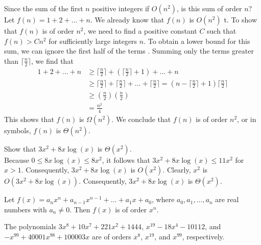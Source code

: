 \documentclass[12pt]{article}
\begin{document}
\begin{example} Since the sum of the first $n$ positive integers if $O(n^2)$, is this sum of order $n$? \\ 
Let $f(n) = 1 + 2 + \dots + n$. We already know that $f(n)$ is $O(n^2)$ t. To show that $f(n)$ is of order $n^2$, we need to find a positive constant $C$ such that $f(n) > Cn^2$ for sufficiently large integers $n$. To obtain a lower bound for this sum, we can ignore the first half of the terms . Summing only the terms greater than $\Big\lceil \frac{n}{2} \Big\rceil$, we find that $$ \begin{aligned} 1 + 2 + \dots + n &\geq \Big\lceil \frac{n}{2} \Big\rceil + (\Big\lceil \frac{n}{2} \Big\rceil + 1) + \dots + n \\ &\geq \Big\lceil \frac{n}{2} \Big\rceil + \Big\lceil \frac{n}{2} \Big\rceil + \dots + \Big\lceil \frac{n}{2} \Big\rceil = (n - \Big\lceil \frac{n}{2} \Big\rceil + 1)\Big\lceil \frac{n}{2} \Big\rceil \\ &\geq (\frac{n}{2})(\frac{n}{2}) \\ &= \frac{n^2}{4} \end{aligned} $$ This shows that $f(n)$ is $\Omega(n^2)$. We conclude that $f(n)$ is of order $n^2$, or in symbols, $f(n)$ is $\Theta(n^2)$. \end{example} 
\begin{example} Show that $3x^2 + 8x\log(x)$ is $\Theta(x^2)$. \\ 
Because $0 \leq 8x\log(x) \leq 8x^2$, it follows that $3x^2 + 8x\log(x) \leq 11x^2$ for $x > 1$. Consequently, $3x^2 + 8x\log(x)$ is $O(x^2)$. Clearly, $x^2$ is $O(3x^2 + 8x\log(x))$. Consequently, $3x^2 + 8x\log(x)$ is $\Theta(x^2)$. \end{example} 
\begin{theorem} Let $f(x) = a_nx^n + a_{n - 1}x^{n - 1} + \dots + a_1x + a_0$, where $a_0, a_1, \dots, a_n$ are real numbers with $a_n \neq 0$. Then $f(x)$ is of order $x^n$. \end{theorem} 
\begin{example} The polynomials $3x^8 + 10x^7 + 221x^2 + 1444$, $x^{19} - 18x^4 - 10112$, and $-x^{99} + 40001x^{98} + 100003x$ are of orders $x^8$, $x^{19}$, and $x^{99}$, respectively. \end{example}
\end{document}
